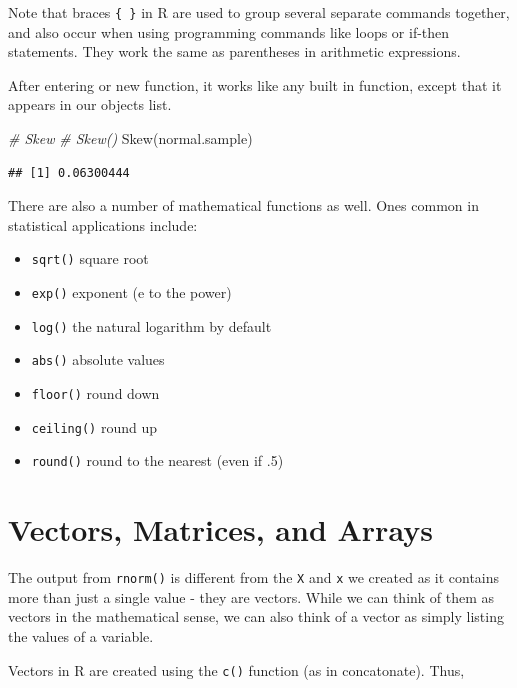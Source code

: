 \documentclass[
]{book}
\newenvironment{Shaded}{\begin{snugshade}}{\end{snugshade}}
\newcommand{\CommentTok}[1]{\textcolor[rgb]{0.56,0.35,0.01}{\textit{#1}}}
\newcommand{\FunctionTok}[1]{\textcolor[rgb]{0.00,0.00,0.00}{#1}}
\newcommand{\NormalTok}[1]{#1}
\providecommand{\tightlist}{%
  \setlength{\itemsep}{0pt}\setlength{\parskip}{0pt}}
\begin{document}
Note that braces \texttt{\{\ \}} in R are used to group several separate commands together, and also occur when using programming commands like loops or if-then statements. They work the same as parentheses in arithmetic expressions.

After entering or new function, it works like any built in function, except that it appears in our objects list.

\begin{Shaded}
\begin{Highlighting}[]
\CommentTok{\# Skew}
\CommentTok{\# Skew()}
\FunctionTok{Skew}\NormalTok{(normal.sample)}
\end{Highlighting}
\end{Shaded}

\begin{verbatim}
## [1] 0.06300444
\end{verbatim}

There are also a number of mathematical functions as well. Ones common in statistical applications include:

\begin{itemize}
\tightlist
\item
  \texttt{sqrt()} square root
\item
  \texttt{exp()} exponent (e to the power)
\item
  \texttt{log()} the natural logarithm by default
\item
  \texttt{abs()} absolute values
\item
  \texttt{floor()} round down
\item
  \texttt{ceiling()} round up
\item
  \texttt{round()} round to the nearest (even if .5)
\end{itemize}

\hypertarget{vectors-matrices-and-arrays}{%
\section{Vectors, Matrices, and Arrays}\label{vectors-matrices-and-arrays}}

The output from \texttt{rnorm()} is different from the \texttt{X} and \texttt{x} we created as it contains more than just a single value - they are vectors. While we can think of them as vectors in the mathematical sense, we can also think of a vector as simply listing the values of a variable.

Vectors in R are created using the \texttt{c()} function (as in concatonate). Thus,
\end{document}
